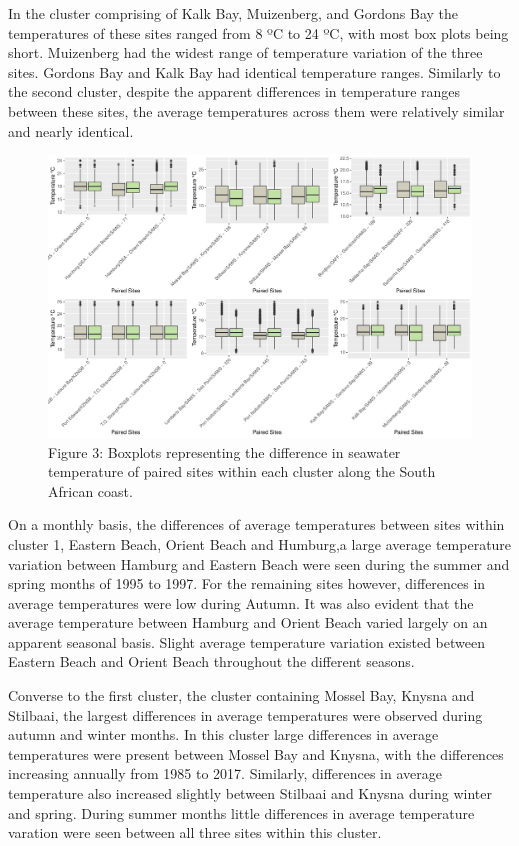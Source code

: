 \documentclass[12pt,]{article}
\begin{document}
In the cluster comprising of Kalk Bay, Muizenberg, and Gordons Bay the
temperatures of these sites ranged from 8 ºC to 24 ºC, with most box
plots being short. Muizenberg had the widest range of temperature
variation of the three sites. Gordons Bay and Kalk Bay had identical
temperature ranges. Similarly to the second cluster, despite the
apparent differences in temperature ranges between these sites, the
average temperatures across them were relatively similar and nearly
identical.

\begin{figure}
\centering
\includegraphics{figures/combined_plot.pdf}
\caption{Figure 3: Boxplots representing the difference in seawater
temperature of paired sites within each cluster along the South African
coast.}
\end{figure}

On a monthly basis, the differences of average temperatures between
sites within cluster 1, Eastern Beach, Orient Beach and Humburg,a large
average temperature variation between Hamburg and Eastern Beach were
seen during the summer and spring months of 1995 to 1997. For the
remaining sites however, differences in average temperatures were low
during Autumn. It was also evident that the average temperature between
Hamburg and Orient Beach varied largely on an apparent seasonal basis.
Slight average temperature variation existed between Eastern Beach and
Orient Beach throughout the different seasons.

Converse to the first cluster, the cluster containing Mossel Bay, Knysna
and Stilbaai, the largest differences in average temperatures were
observed during autumn and winter months. In this cluster large
differences in average temperatures were present between Mossel Bay and
Knysna, with the differences increasing annually from 1985 to 2017.
Similarly, differences in average temperature also increased slightly
between Stilbaai and Knysna during winter and spring. During summer
months little differences in average temperature varation were seen
between all three sites within this cluster.
\end{document}
